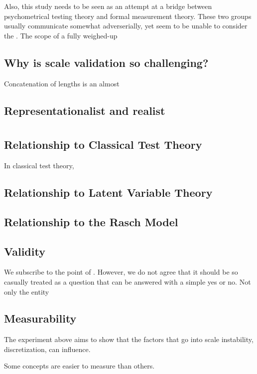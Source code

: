 \documentclass[utf8]{FrontiersinVancouver}
\begin{document}
Also, this study needs to be seen as an attempt at a bridge between psychometrical testing theory and formal measurement theory. These two groups usually communicate somewhat adverserially, yet seem to be unable to consider the . The scope of a fully weighed-up 

\subsection{Why is scale validation so challenging?}
Concatenation of lengths is an almost 

\subsection{Representationalist and realist }

\section{}
\subsection{Relationship to Classical Test Theory}
In classical test theory, 

\subsection{Relationship to Latent Variable Theory}

\subsection{Relationship to the Rasch Model}

\subsection{Validity}
We subscribe to the point of . However, we do not agree that it should be so casually treated as a question that can be answered with a simple yes or no. Not only the entity 

\subsection{Measurability}
The experiment above aims to show that the factors that go into scale instability, discretization, can influence. 

Some concepts are easier to measure than others. 
\end{document}
